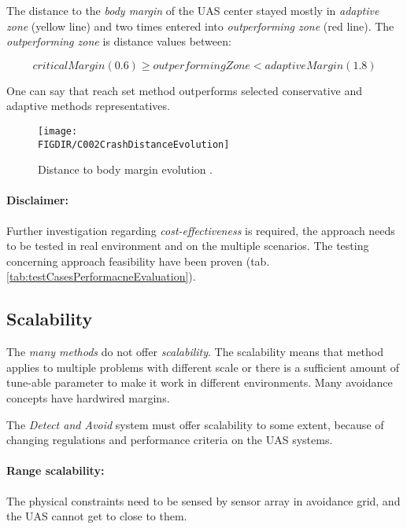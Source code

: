 The distance to the \emph{body margin} of the UAS center stayed mostly in \emph{adaptive zone} (yellow line) and two times entered into \emph{outperforming zone} (red line). The \emph{outperforming zone} is distance values between:

\begin{equation*}
    critical Margin (0.6) \ge outperforming Zone < adaptive Margin (1.8)   
\end{equation*}

One can say that reach set method outperforms selected conservative and adaptive methods representatives.

\begin{figure}[H]
    \centering
    \texttt{[image: \\FIGDIR/C002CrashDistanceEvolution]} 
    \caption{Distance to body margin evolution \cite{hrdlik2018}.}
    \label{fig:crashDistanceEvolution}
\end{figure}

\paragraph{Disclaimer:} Further investigation regarding \emph{cost-effectiveness} is required, the approach needs to be tested in real environment and on the multiple scenarios. The testing concerning approach feasibility have been proven (tab. \ref{tab:testCasesPerformacneEvaluation}).

\subsection{Scalability}\label{s:conclusionScalability}
\noindent The \emph{many methods} do not offer \emph{scalability}. The scalability means that method applies to multiple problems with different scale or there is a sufficient amount of tune-able parameter to make it work in different environments. Many avoidance concepts have hardwired margins. 

The \emph{Detect and Avoid} system must offer scalability to some extent, because of changing regulations and performance criteria on the UAS systems.

\paragraph{Range scalability:} The physical constraints need to be sensed by sensor array in avoidance grid, and the UAS cannot get to close to them. 

